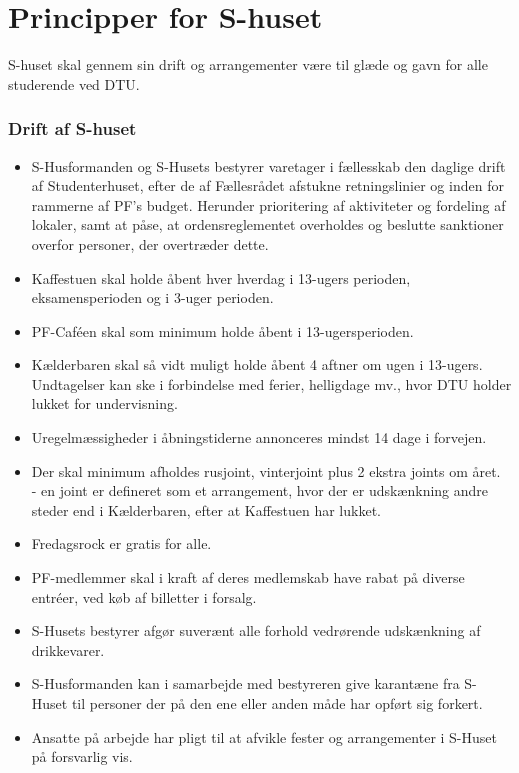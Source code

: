 \section{Principper for S-huset}
S-huset skal gennem sin drift og arrangementer være til glæde og gavn for alle studerende ved DTU.
\subsubsection{Drift af S-huset}
\begin{itemize}
\item S-Husformanden og S-Husets bestyrer varetager i fællesskab den daglige drift af Studenterhuset, efter de af Fællesrådet afstukne retningslinier og inden for rammerne af PF's budget. Herunder prioritering af aktiviteter og fordeling af lokaler, samt at påse, at ordensreglementet overholdes og beslutte sanktioner overfor personer, der overtræder dette.
\item Kaffestuen skal holde åbent hver hverdag i 13-ugers perioden, eksamensperioden og i 3-uger perioden.
\item PF-Caféen skal som minimum holde åbent i 13-ugersperioden.
\item Kælderbaren skal så vidt muligt holde åbent 4 aftner om ugen i 13-ugers. Undtagelser kan ske i forbindelse med ferier, helligdage mv., hvor DTU holder lukket for undervisning.
\item Uregelmæssigheder i åbningstiderne annonceres mindst 14 dage i forvejen.
\item Der skal minimum afholdes rusjoint, vinterjoint plus 2 ekstra joints om året.\\
- en joint er defineret som et arrangement, hvor der er udskænkning andre steder end i Kælderbaren, efter at Kaffestuen har lukket.
\item Fredagsrock er gratis for alle.
\item PF-medlemmer skal i kraft af deres medlemskab have rabat på diverse entréer, ved køb af billetter i forsalg.
\item S-Husets bestyrer afgør suverænt alle forhold vedrørende udskænkning af drikkevarer.
\item S-Husformanden kan i samarbejde med bestyreren give karantæne fra S-Huset til personer der på den ene eller anden måde har opført sig forkert.
\item Ansatte på arbejde har pligt til at afvikle fester og arrangementer i S-Huset på forsvarlig vis.
\end{itemize}

